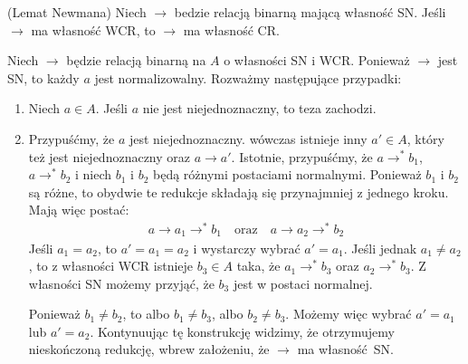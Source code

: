 \begin{twierdzenie}(Lemat Newmana)\label{thm:newman_lemma}
Niech \(\to\) bedzie relacją binarną mającą własność SN. Jeśli \(\to\) ma własność WCR, to \(\to\) ma własność CR.
\end{twierdzenie}
\begin{dowod}


Niech \(\to\) będzie relacją binarną na \(A\) o własności SN i WCR. Ponieważ \(\to\) jest SN, to każdy \(a\) jest normalizowalny. Rozważmy następujące przypadki:

\begin{minipage}{.75\textwidth}
\begin{enumerate}[label={\roman*)}, ref={\roman*)}]
  \setlength\itemsep{0em}
  \item Niech \(a\in A\). Jeśli \(a\) nie jest niejednoznaczny, to teza zachodzi.
  \item
      Przypuśćmy, że \(a\) jest niejednoznaczny. wówczas istnieje inny \(a'\in A\), który też jest niejednoznaczny oraz \(a\to a'\). Istotnie, przypuśćmy, że \(a\to^{*} b_1\), \(a \to^{*} b_2\) i niech \(b_1\) i \(b_2\) będą różnymi postaciami normalnymi. Ponieważ \(b_1\) i \(b_2\) są różne, to obydwie te redukcje składają się przynajmniej z jednego kroku. Mają więc postać:
      \begin{align*}
        a \to a_1 \to^{*} b_1 \quad \text{oraz} \quad a\to a_2 \to^{*} b_2
      \end{align*}
    Jeśli \(a_1=a_2\), to \(a'=a_1=a_2\) i wystarczy wybrać \(a'=a_1\).
    Jeśli jednak \(a_1 \neq a_2\), to z własności WCR istnieje
    \(b_3 \in A\) taka, że \(a_1 \to^{*} b_3\) oraz \(a_2 \to^{*} b_3\).
    Z własności SN możemy przyjąć, że \(b_3\) jest w postaci normalnej.

    \vspace{3em}
    Ponieważ \(b_1 \neq b_2\), to albo \(b_1 \neq b_3\), albo \(b_2 \neq b_3\).
    Możemy więc wybrać \(a'=a_1\) lub \(a'=a_2\). Kontynuując tę konstrukcję widzimy, że otrzymujemy nieskończoną redukcję, wbrew założeniu, że \(\to\) ma własność SN.


\end{enumerate}
\end{minipage}
\end{dowod}
